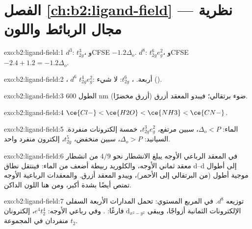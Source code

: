 \section*{الفصل \ref{ch:b2:ligand-field} --- نظرية مجال الربائط واللون}

\begin{solution}{exo:b2:ligand-field:1}
$d^3$: $t_{2g}^3$، وCFSE $-1.2\Delta_o$. $d^8$: $t_{2g}^6e_g^2$، وCFSE $-2.4 + 1.2 = -1.2\Delta_o$.
\end{solution}

\begin{solution}{exo:b2:ligand-field:2}
، $d^6$  $t_{2g}^4e_g^2$: أربعة. ، 
$t_{2g}^6$: لا شيء ().
\end{solution}

\begin{solution}{exo:b2:ligand-field:3}
الطول 600 nm ضوء برتقالي؛ فيبدو المعقد أزرق (أزرق مخضرًا).
\end{solution}

\begin{solution}{exo:b2:ligand-field:4}
$\ce{Cl-} < \ce{H2O} < \ce{NH3} < \ce{CN-}$.
\end{solution}

\begin{solution}{exo:b2:ligand-field:5}
الماء: $\Delta_o < P$، سبين مرتفع، $t_{2g}^3e_g^2$، خمسة إلكترونات منفردة. السيانيد: $\Delta_o > P$،
سبين منخفض، $t_{2g}^5$، إلكترون منفرد واحد.
\end{solution}

\begin{solution}{exo:b2:ligand-field:6}
في المعقد الرباعي الأوجه  يبلغ الانشطار نحو $4/9$ من انشطار معقد ثماني الأوجه، 
والكلوريد ربيطة أضعف من الماء: فينتقل نطاق d--d إلى أطوال موجية أطول (من البرتقالي
إلى الأحمر)، ويبدو المعقد أزرق. والمعقدات الرباعية الأوجه تمتص أيضًا بشدة أكبر،
ومن هنا اللون الداكن.
\end{solution}

\begin{solution}{exo:b2:ligand-field:7}
 توزيعه $d^8$. في المربع المستوي: تحمل المدارات الأربعة السفلى الإلكترونات الثمانية أزواجًا،
ويبقى $\mathrm d_{x^2-y^2}$ فارغًا: . وفي رباعي الأوجه: $e^4t_2^4$، إلكترونان منفردان
في المجموعة $t_2$.
\end{solution}

